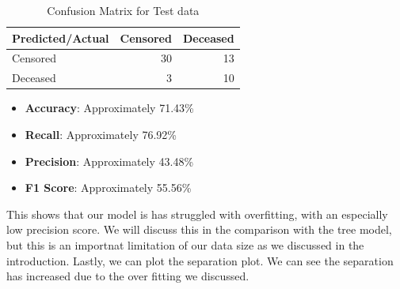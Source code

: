 \documentclass[
]{article}
\newenvironment{Shaded}{\begin{snugshade}}{\end{snugshade}}
\newcommand{\AttributeTok}[1]{\textcolor[rgb]{0.13,0.29,0.53}{#1}}
\newcommand{\CommentTok}[1]{\textcolor[rgb]{0.56,0.35,0.01}{\textit{#1}}}
\newcommand{\DecValTok}[1]{\textcolor[rgb]{0.00,0.00,0.81}{#1}}
\newcommand{\FunctionTok}[1]{\textcolor[rgb]{0.13,0.29,0.53}{\textbf{#1}}}
\newcommand{\NormalTok}[1]{#1}
\newcommand{\OtherTok}[1]{\textcolor[rgb]{0.56,0.35,0.01}{#1}}
\newcommand{\SpecialCharTok}[1]{\textcolor[rgb]{0.81,0.36,0.00}{\textbf{#1}}}
\newcommand{\StringTok}[1]{\textcolor[rgb]{0.31,0.60,0.02}{#1}}
\begin{document}
\begin{Shaded}
\end{Shaded}

\begin{table}

\caption{\label{tab:unnamed-chunk-42}Confusion Matrix for Test data}
\centering
\begin{tabular}[t]{l|r|r}
\hline
Predicted/Actual & Censored & Deceased\\
\hline
Censored & 30 & 13\\
\hline
Deceased & 3 & 10\\
\hline
\end{tabular}
\end{table}

\begin{itemize}
\item
  \textbf{Accuracy}: Approximately 71.43\%
\item
  \textbf{Recall}: Approximately 76.92\%
\item
  \textbf{Precision}: Approximately 43.48\%
\item
  \textbf{F1 Score}: Approximately 55.56\%
\end{itemize}

This shows that our model is has struggled with overfitting, with an
especially low precision score. We will discuss this in the comparison
with the tree model, but this is an importnat limitation of our data
size as we discussed in the introduction. Lastly, we can plot the
separation plot. We can see the separation has increased due to the over
fitting we discussed.
\end{document}
